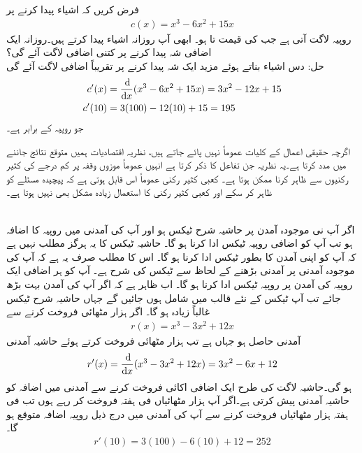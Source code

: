 فرض کریں کہ   اشیاء پیدا کرنے  پر
\begin{align*}
c(x)=x^3-6x^2+15x
\end{align*}
روپیہ لاگت آتی ہے جب  کی قیمت  تا  ہو۔ ابھی آپ روزانہ  اشیاء پیدا کرتے ہیں۔روزانہ ایک اضافی شہ پیدا کرنے پر کتنی 
 اضافی لاگت آئے گی؟\\
حل:\quad
دس اشیاء بناتے ہوئے مزید ایک شہ پیدا کرنے پر تقریباً  اضافی لاگت آئے گی
\begin{align*}
c'(x)&=\frac{\dif}{\dif x}(x^3-6x^2+15x)=3x^2-12x+15\\
c'(10)&=3(100)-12(10)+15=195
\end{align*}
جو  روپیہ کے برابر ہے۔

اگرچہ حقیقی اعمال کے کلیات عموماً نہیں پائے جاتے ہیں، نظریہ اقتصادیات ہمیں متوقع نتائج جاننے میں مدد کرتا ہے۔یہ نظریہ جن تفاعل کا ذکر کرتا ہے انہیں عموماً موزوں وقفہ پر کم درجے کی کثیر رکنیوں سے ظاہر کرنا ممکن ہوتا ہے۔ کعبی کثیر رکنی عموماً اس قابل ہوتی ہے کہ پیچیدہ مسئلے کو ظاہر کر سکے اور کعبی کثیر رکنی  کا  استعمال  زیادہ مشکل بھی نہیں ہوتا ہے۔ 

\\
اگر آپ نی موجودہ آمدن پر حاشیہ شرح ٹیکس  ہو اور آپ کی آمدنی میں  روپیہ کا اضافہ ہو تب آپ کو اضافی  روپیہ ٹیکس ادا کرنا ہو گا۔   حاشیہ ٹیکس کا یہ ہرگز مطلب نہیں ہے کہ آپ کو اپنی آمدن کا  بطور ٹیکس ادا کرنا ہو گا۔ اس کا مطلب صرف یہ ہے کہ آپ کی موجودہ آمدنی  پر آمدنی بڑھنے کے لحاظ سے ٹیکس کی شرح  ہے۔ آپ کو ہر اضافی ایک روپیہ کی آمدن پر  روپیہ ٹیکس ادا کرنا ہو گا۔ اب ظاہر ہے کہ اگر آپ کی آمدن بہت بڑھ جائے تب آپ ٹیکس کے نئے قالب میں شامل ہوں جائیں گے جہاں حاشیہ شرح ٹیکس غالباً زیادہ ہو گا۔  
اگر  ہزار مٹھائی فروخت کرنے سے 
\begin{align*}
r(x)=x^3-3x^2+12x
\end{align*}
آمدنی حاصل ہو جہاں  ہے تب  ہزار مٹھائی فروخت کرتے ہوئے حاشیہ آمدنی
\begin{align*}
r'(x)=\frac{\dif}{\dif x}(x^3-3x^2+12x)=3x^2-6x+12
\end{align*}
ہو گی۔حاشیہ لاگت کی طرح ایک اضافی اکائی فروخت کرنے سے آمدنی میں اضافہ کو حاشیہ آمدنی پیش کرتی ہے۔اگر آپ  ہزار مٹھائیاں فی ہفتہ فروخت کر رہے ہوں تب فی ہفتہ  ہزار مٹھائیاں فروخت کرنے سے آپ کی آمدنی میں درج ذیل روپیہ اضافہ متوقع ہو گا۔
\begin{align*}
r'(10)=3(100)-6(10)+12=252
\end{align*} 

